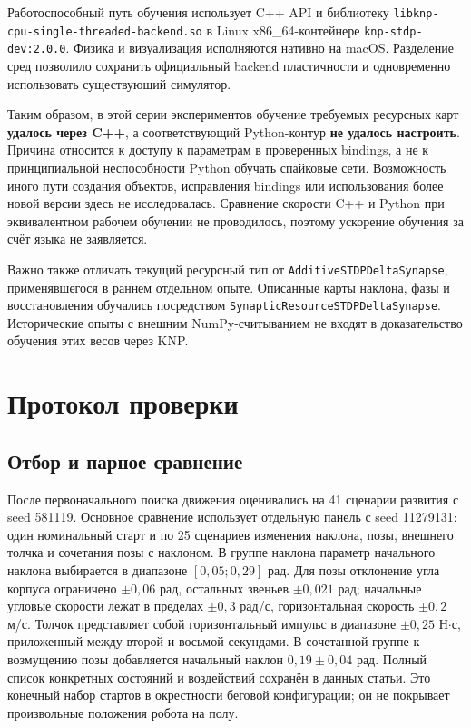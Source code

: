 \documentclass[11pt,a4paper]{article}
\newcommand{\code}[1]{\texttt{#1}}
\begin{document}
Работоспособный путь обучения использует C++ API и библиотеку
\code{libknp-cpu-single-threaded-backend.so} в Linux x86\_64-контейнере
\code{knp-stdp-dev:2.0.0}. Физика и визуализация исполняются нативно на macOS. Разделение сред позволило сохранить официальный backend пластичности и одновременно использовать существующий симулятор.

Таким образом, в этой серии экспериментов обучение требуемых ресурсных карт \textbf{удалось через C++}, а соответствующий Python-контур \textbf{не удалось настроить}. Причина относится к доступу к параметрам в проверенных bindings, а не к принципиальной неспособности Python обучать спайковые сети. Возможность иного пути создания объектов, исправления bindings или использования более новой версии здесь не исследовалась. Сравнение скорости C++ и Python при эквивалентном рабочем обучении не проводилось, поэтому ускорение обучения за счёт языка не заявляется.

Важно также отличать текущий ресурсный тип от \code{AdditiveSTDPDeltaSynapse}, применявшегося в раннем отдельном опыте. Описанные карты наклона, фазы и восстановления обучались посредством \code{SynapticResourceSTDPDeltaSynapse}. Исторические опыты с внешним NumPy-считыванием не входят в доказательство обучения этих весов через KNP.

\section{Протокол проверки}
\subsection{Отбор и парное сравнение}
После первоначального поиска движения оценивались на 41 сценарии развития с seed 581119. Основное сравнение использует отдельную панель с seed 11279131: один номинальный старт и по 25 сценариев изменения наклона, позы, внешнего толчка и сочетания позы с наклоном. В группе наклона параметр начального наклона выбирается в диапазоне $[0{,}05;0{,}29]$ рад. Для позы отклонение угла корпуса ограничено $\pm0{,}06$ рад, остальных звеньев \textemdash{} $\pm0{,}021$ рад; начальные угловые скорости лежат в пределах $\pm0{,}3$ рад/с, горизонтальная скорость \textemdash{} $\pm0{,}2$ м/с. Толчок представляет собой горизонтальный импульс в диапазоне $\pm0{,}25$ Н$\cdot$с, приложенный между второй и восьмой секундами. В сочетанной группе к возмущению позы добавляется начальный наклон $0{,}19\pm0{,}04$ рад. Полный список конкретных состояний и воздействий сохранён в данных статьи. Это конечный набор стартов в окрестности беговой конфигурации; он не покрывает произвольные положения робота на полу.
\end{document}
